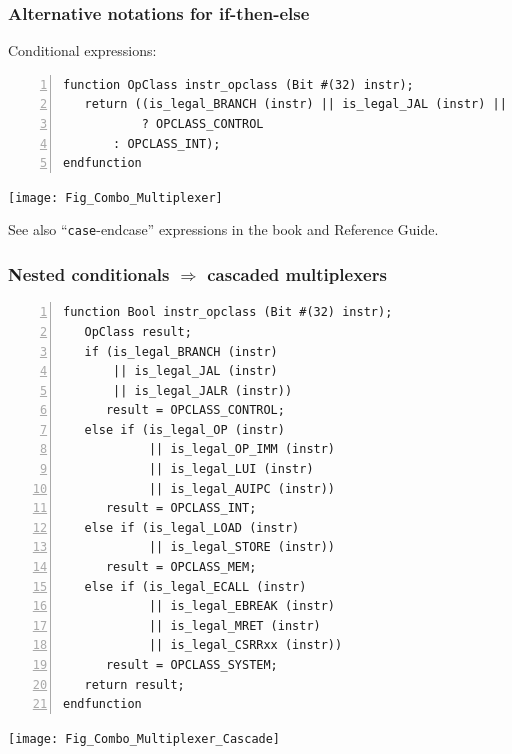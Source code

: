 
\begin{frame}[fragile]
\frametitle{Alternative notations for if-then-else}

\footnotesize

Conditional expressions:

\begin{Verbatim}[frame=single, numbers=left]
function OpClass instr_opclass (Bit #(32) instr);
   return ((is_legal_BRANCH (instr) || is_legal_JAL (instr) || is_legal_JALR (instr))
           ? OPCLASS_CONTROL
	   : OPCLASS_INT);
endfunction
\end{Verbatim}

\vspace{1ex}

\begin{center}
 \texttt{[image: Fig\_Combo\_Multiplexer]}
\end{center}

\vspace{3ex}

See also ``{\tt case}-{endcase}'' expressions in the book and {\BSV} Reference Guide.

\end{frame}


\begin{frame}[fragile]
\frametitle{Nested conditionals $\Rightarrow$ cascaded multiplexers}

\begin{minipage}{0.3\textwidth}\tiny
\begin{Verbatim}[frame=single, numbers=left]
function Bool instr_opclass (Bit #(32) instr);
   OpClass result;
   if (is_legal_BRANCH (instr)
       || is_legal_JAL (instr)
       || is_legal_JALR (instr))
      result = OPCLASS_CONTROL;
   else if (is_legal_OP (instr)
            || is_legal_OP_IMM (instr)
            || is_legal_LUI (instr)
            || is_legal_AUIPC (instr))
      result = OPCLASS_INT;
   else if (is_legal_LOAD (instr)
            || is_legal_STORE (instr))
      result = OPCLASS_MEM;
   else if (is_legal_ECALL (instr)
            || is_legal_EBREAK (instr)
            || is_legal_MRET (instr)
            || is_legal_CSRRxx (instr))
      result = OPCLASS_SYSTEM;
   return result;
endfunction
\end{Verbatim}
\end{minipage}
\hm
\begin{minipage}{0.65\textwidth}
\begin{center}
 \texttt{[image: Fig\_Combo\_Multiplexer\_Cascade]}
\end{center}
\end{minipage}

\end{frame}

